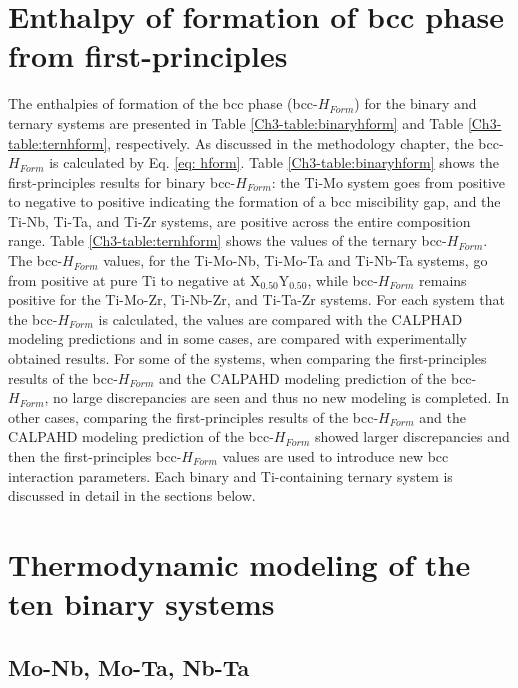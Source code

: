 \section{Enthalpy of formation of bcc phase from first-principles}

The enthalpies of formation of the bcc phase (bcc-$H_{Form}$) for the binary and ternary systems are presented in Table \ref{Ch3-table:binaryhform} and Table \ref{Ch3-table:ternhform}, respectively. As discussed in the methodology chapter, the bcc-$H_{Form}$ is calculated by Eq. \ref{eq: hform}. Table \ref{Ch3-table:binaryhform} shows the first-principles results for binary bcc-$H_{Form}$: the Ti-Mo system goes from positive to negative to positive indicating the formation of a bcc miscibility gap, and the Ti-Nb, Ti-Ta, and Ti-Zr systems, are positive across the entire composition range. Table \ref{Ch3-table:ternhform} shows the values of the ternary bcc-$H_{Form}$.  The bcc-$H_{Form}$ values, for the Ti-Mo-Nb, Ti-Mo-Ta and Ti-Nb-Ta systems, go from positive at pure Ti to negative at X$_{0.50}$Y$_{0.50}$, while bcc-$H_{Form}$ remains positive for the Ti-Mo-Zr, Ti-Nb-Zr, and Ti-Ta-Zr systems. For each system that the bcc-$H_{Form}$ is calculated, the values are compared with the CALPHAD modeling predictions and in some cases, are compared with experimentally obtained results. For some of the systems, when comparing the first-principles results of the bcc-$H_{Form}$ and the CALPAHD modeling prediction of the bcc-$H_{Form}$, no large discrepancies are seen and thus no new modeling is completed. In other cases, comparing the first-principles results of the bcc-$H_{Form}$ and the CALPAHD modeling prediction of the bcc-$H_{Form}$ showed larger discrepancies and then the first-principles bcc-$H_{Form}$ values are used to introduce new bcc interaction parameters. Each binary and Ti-containing ternary system is discussed in detail in the sections below.

\section{Thermodynamic modeling of the ten binary systems}

\subsection{Mo-Nb, Mo-Ta, Nb-Ta}

